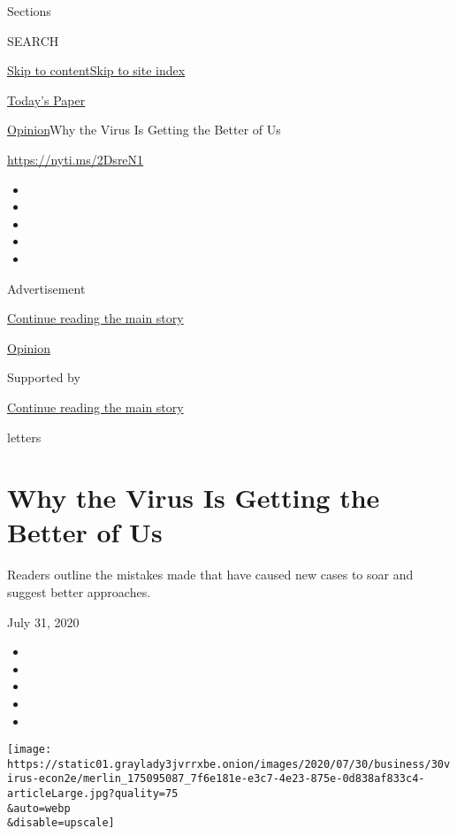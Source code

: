 Sections

SEARCH

\protect\hyperlink{site-content}{Skip to
content}\protect\hyperlink{site-index}{Skip to site index}

\href{https://myaccount.nytimes3xbfgragh.onion/auth/login?response_type=cookie\&client_id=vi}{}

\href{https://www.nytimes3xbfgragh.onion/section/todayspaper}{Today's
Paper}

\href{/section/opinion}{Opinion}\textbar{}Why the Virus Is Getting the
Better of Us

\url{https://nyti.ms/2DsreN1}

\begin{itemize}
\item
\item
\item
\item
\item
\end{itemize}

Advertisement

\protect\hyperlink{after-top}{Continue reading the main story}

\href{/section/opinion}{Opinion}

Supported by

\protect\hyperlink{after-sponsor}{Continue reading the main story}

letters

\hypertarget{why-the-virus-is-getting-the-better-of-us}{%
\section{Why the Virus Is Getting the Better of
Us}\label{why-the-virus-is-getting-the-better-of-us}}

Readers outline the mistakes made that have caused new cases to soar and
suggest better approaches.

July 31, 2020

\begin{itemize}
\item
\item
\item
\item
\item
\end{itemize}

\texttt{[image: https://static01.graylady3jvrrxbe.onion/images/2020/07/30/business/30virus-econ2e/merlin\_175095087\_7f6e181e-e3c7-4e23-875e-0d838af833c4-articleLarge.jpg?quality=75\\\&auto=webp\\\&disable=upscale]}

